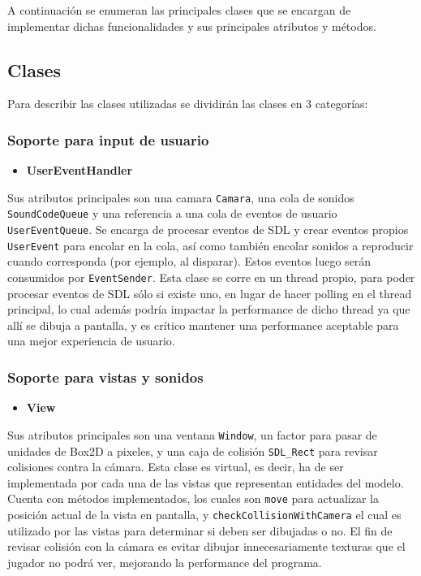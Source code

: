 \documentclass[a4paper]{article}
\begin{document}
A continuación se enumeran las principales clases que se encargan de implementar dichas funcionalidades y sus principales atributos y métodos.

\subsection{Clases}

Para describir las clases utilizadas se dividirán las clases en 3 categorías:

\subsubsection{Soporte para input de usuario}

\begin{itemize}
	\item \textbf{UserEventHandler}
\end{itemize}

Sus atributos principales son una camara \texttt{Camara}, una cola de sonidos \texttt{SoundCodeQueue} y una referencia a una cola de eventos de usuario \texttt{UserEventQueue}. 
Se encarga de procesar eventos de SDL y crear eventos propios \texttt{UserEvent} para encolar en la cola, así como también encolar sonidos a reproducir cuando corresponda (por ejemplo, al disparar).
Estos eventos luego serán consumidos por \texttt{EventSender}.
Esta clase se corre en un thread propio, para poder procesar eventos de SDL sólo si existe uno, en lugar de hacer polling en el thread principal, lo cual además podría impactar la performance de dicho thread ya que allí se dibuja a pantalla, y es crítico mantener una performance aceptable para una mejor experiencia de usuario.

\subsubsection{Soporte para vistas y sonidos}

\begin{itemize}
	\item \textbf{View}
\end{itemize}

Sus atributos principales son una ventana \texttt{Window}, un factor para pasar de unidades de Box2D a pixeles, y una caja de colisión \texttt{SDL\_Rect} para revisar colisiones contra la cámara.
Esta clase es virtual, es decir, ha de ser implementada por cada una de las vistas que representan entidades del modelo.
Cuenta con métodos implementados, los cuales son \texttt{move} para actualizar la posición actual de la vista en pantalla, y \texttt{checkCollisionWithCamera} el cual es utilizado por las vistas para determinar si deben ser dibujadas o no.
El fin de revisar colisión con la cámara es evitar dibujar innecesariamente texturas que el jugador no podrá ver, mejorando la performance del programa.
\end{document}
